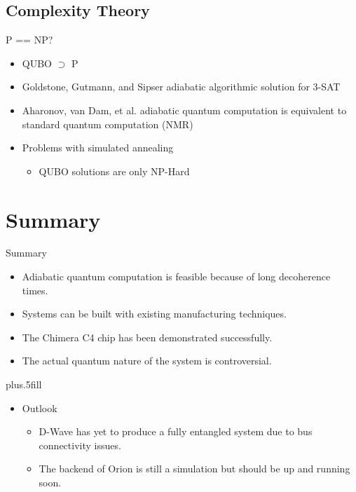 \documentclass{beamer}
\begin{document}
\subsection{Complexity Theory}

\begin{frame}{P == NP?}
 \begin{itemize}
  \item QUBO \(\supset\) P
  \pause
  \item Goldstone, Gutmann, and Sipser adiabatic algorithmic solution for 3-SAT
  \item Aharonov, van Dam, et al. adiabatic quantum computation is equivalent to standard quantum computation (NMR)
  \pause
  \item Problems with simulated annealing
  \begin{itemize}
   \item QUBO solutions are only NP-Hard
  \end{itemize}


 \end{itemize}

\end{frame}


\section*{Summary}

\begin{frame}{Summary}

  \begin{itemize}
  \item
    Adiabatic quantum computation is feasible because of long decoherence times. 
  \item Systems can be built with existing manufacturing techniques.
  \item
    The Chimera C4 chip has been demonstrated successfully.
  \item
    The actual quantum nature of the system is controversial.
  \end{itemize}
  
  \vskip0pt plus.5fill
  \begin{itemize}
  \item
    Outlook
    \begin{itemize}
    \item
      D-Wave has yet to produce a fully entangled system due to bus connectivity issues.
    \item
      The backend of Orion is still a simulation but should be up and running soon.
    \end{itemize}
  \end{itemize}
\end{frame}
\end{document}

